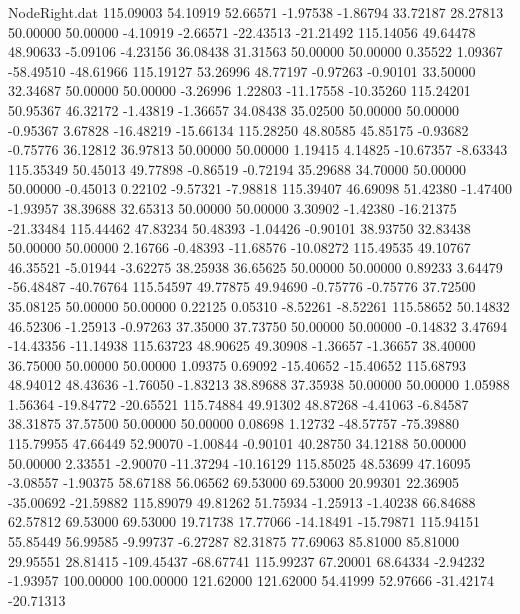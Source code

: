 \begin{filecontents}{NodeRight.dat}
 115.09003   54.10919   52.66571    -1.97538   -1.86794   33.72187   28.27813   50.00000   50.00000   -4.10919   -2.66571  -22.43513  -21.21492
 115.14056   49.64478   48.90633    -5.09106   -4.23156   36.08438   31.31563   50.00000   50.00000    0.35522    1.09367  -58.49510  -48.61966
 115.19127   53.26996   48.77197    -0.97263   -0.90101   33.50000   32.34687   50.00000   50.00000   -3.26996    1.22803  -11.17558  -10.35260
 115.24201   50.95367   46.32172    -1.43819   -1.36657   34.08438   35.02500   50.00000   50.00000   -0.95367    3.67828  -16.48219  -15.66134
 115.28250   48.80585   45.85175    -0.93682   -0.75776   36.12812   36.97813   50.00000   50.00000    1.19415    4.14825  -10.67357   -8.63343
 115.35349   50.45013   49.77898    -0.86519   -0.72194   35.29688   34.70000   50.00000   50.00000   -0.45013    0.22102   -9.57321   -7.98818
 115.39407   46.69098   51.42380    -1.47400   -1.93957   38.39688   32.65313   50.00000   50.00000    3.30902   -1.42380  -16.21375  -21.33484
 115.44462   47.83234   50.48393    -1.04426   -0.90101   38.93750   32.83438   50.00000   50.00000    2.16766   -0.48393  -11.68576  -10.08272
 115.49535   49.10767   46.35521    -5.01944   -3.62275   38.25938   36.65625   50.00000   50.00000    0.89233    3.64479  -56.48487  -40.76764
 115.54597   49.77875   49.94690    -0.75776   -0.75776   37.72500   35.08125   50.00000   50.00000    0.22125    0.05310   -8.52261   -8.52261
 115.58652   50.14832   46.52306    -1.25913   -0.97263   37.35000   37.73750   50.00000   50.00000   -0.14832    3.47694  -14.43356  -11.14938
 115.63723   48.90625   49.30908    -1.36657   -1.36657   38.40000   36.75000   50.00000   50.00000    1.09375    0.69092  -15.40652  -15.40652
 115.68793   48.94012   48.43636    -1.76050   -1.83213   38.89688   37.35938   50.00000   50.00000    1.05988    1.56364  -19.84772  -20.65521
 115.74884   49.91302   48.87268    -4.41063   -6.84587   38.31875   37.57500   50.00000   50.00000    0.08698    1.12732  -48.57757  -75.39880
 115.79955   47.66449   52.90070    -1.00844   -0.90101   40.28750   34.12188   50.00000   50.00000    2.33551   -2.90070  -11.37294  -10.16129
 115.85025   48.53699   47.16095    -3.08557   -1.90375   58.67188   56.06562   69.53000   69.53000   20.99301   22.36905  -35.00692  -21.59882
 115.89079   49.81262   51.75934    -1.25913   -1.40238   66.84688   62.57812   69.53000   69.53000   19.71738   17.77066  -14.18491  -15.79871
 115.94151   55.85449   56.99585    -9.99737   -6.27287   82.31875   77.69063   85.81000   85.81000   29.95551   28.81415 -109.45437  -68.67741
 115.99237   67.20001   68.64334    -2.94232   -1.93957  100.00000  100.00000  121.62000  121.62000   54.41999   52.97666  -31.42174  -20.71313

\end{filecontents}
